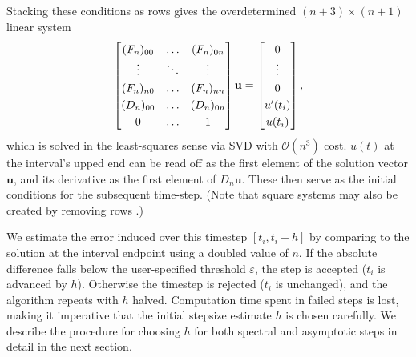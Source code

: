 \documentclass[10pt]{article}
\newcommand{\be}{\begin{equation}}
\newcommand{\ee}{\end{equation}}
\newcommand{\eg}{{\it e.g.\ }}
\newcommand{\mbf}[1]{{\mathbf #1}}
\newcommand{\bigO}{{\mathcal O}}
\begin{document}
Stacking these conditions as rows gives the overdetermined $(n+3) \times (n+1)$ linear system
\be\label{discreteodeic}
\renewcommand*{\arraystretch}{1.25}
\begin{bmatrix}
    (F_n)_{00} & \ldots & (F_n)_{0n} \\
    \vdots & \ddots & \vdots \\
    (F_n)_{n0} & \ldots & (F_n)_{nn} \\
    (D_n)_{00} & \ldots & (D_n)_{0n} \\
    0 & \ldots & 1
\end{bmatrix}
\mbf{u} =  
\begin{bmatrix}
0 \\
\vdots \\
0 \\
u'(t_i) \\
u(t_i)
\end{bmatrix},
\ee
which is solved in the least-squares sense via SVD with $\bigO(n^3)$ cost.
$u(t)$ at the interval's upped end can be read off as the first element of the
solution vector $\mbf{u}$, and its derivative as the first element of
$D_n\mbf{u}$.
These then serve as the initial conditions for the subsequent time-step.
(Note that square systems may also be created by removing rows \cite{tref}.)

We estimate the error induced over this timestep $[t_i,t_i+h]$
by comparing to the solution at the interval endpoint using a doubled value
of $n$.
If the
absolute
difference falls below the user-specified
threshold $\varepsilon$, the step is accepted ($t_i$ is advanced by $h$).
Otherwise the timestep is rejected ($t_i$ is unchanged), and the algorithm
repeats with $h$ halved.
Computation time spent in failed steps is lost, making
it imperative that the initial stepsize estimate $h$ is chosen carefully. We
describe the procedure for choosing $h$ for both spectral and asymptotic steps
in detail in the next section.
\end{document}
